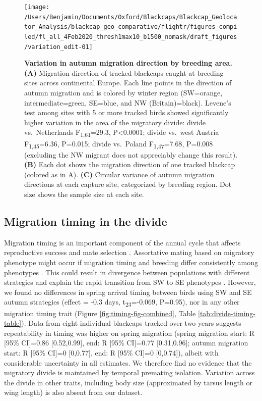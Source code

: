 \documentclass[a4paper, twoside]{templates/ociamthesis}
\begin{document}
\begin{figure}
\texttt{[image: /Users/Benjamin/Documents/Oxford/Blackcaps/Blackcap\_Geolocator\_Analysis/blackcap\_geo\_comparative/flightr/figures\_compiled/fl\_all\_4Feb2020\_thresh1max10\_b1500\_nomask/draft\_figures/variation\_edit-01]} \caption{\textbf{Variation in autumn migration direction by breeding area.} \textbf{(A)} Migration direction of tracked blackcaps caught at breeding sites across continental Europe. Each line points in the direction of autumn migration and is colored by winter region (SW=orange, intermediate=green, SE=blue, and NW (Britain)=black). Levene's test among sites with 5 or more tracked birds showed significantly higher variation in the area of the migratory divide: divide vs.~Netherlands F\textsubscript{1,61}=29.3, P\textless0.0001; divide vs.~west Austria F\textsubscript{1,45}=6.36, P=0.015; divide vs.~Poland F\textsubscript{1,47}=7.68, P=0.008 (excluding the NW migrant does not appreciably change this result). \textbf{(B)} Each dot shows the migration direction of one tracked blackcap (colored as in A). \textbf{(C)} Circular variance of autumn migration directions at each capture site, categorized by breeding region. Dot size shows the sample size at each site.}\label{fig:var-fig-edit}
\end{figure}

\hypertarget{migration-timing-in-the-divide}{%
\subsection{Migration timing in the divide}\label{migration-timing-in-the-divide}}

Migration timing is an important component of the annual cycle that affects reproductive success \autocite{taylorRoleAllochronySpeciation2017,winkerOriginSpeciesHeteropatric2010} and mate selection \autocite{bearhopAssortativeMatingMechanism2005}. Assortative mating based on migratory phenotype might occur if migration timing and breeding differ consistently among phenotypes \autocite{bearhopAssortativeMatingMechanism2005}. This could result in divergence between populations with different strategies and explain the rapid transition from SW to SE phenotypes \autocite{irwinSiberianMigratoryDivides2005}. However, we found no differences in spring arrival timing between birds using SW and SE autumn strategies (effect = -0.3 days, t\textsubscript{23}=-0.069, P=0.95), nor in any other migration timing trait (Figure \ref{fig:timing-fig-combined}, Table \ref{tab:divide-timing-table}). Data from eight individual blackcaps tracked over two years suggests repeatability in timing was higher on spring migration (spring migration start: R {[}95\% CI{]}=0.86 {[}0.52,0.99{]}, end: R {[}95\% CI{]}=0.77 {[}0.31,0.96{]}; autumn migration start: R {[}95\% CI{]}=0 {[}0,0.77{]}, end: R {[}95\% CI{]}=0 {[}0,0.74{]}), albeit with considerable uncertainty in all estimates. We therefore find no evidence that the migratory divide is maintained by temporal premating isolation. Variation across the divide in other traits, including body size (approximated by tarsus length or wing length) is also absent from our dataset.
\end{document}
